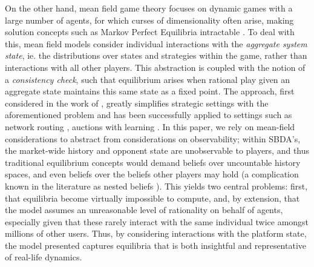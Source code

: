 On the other hand, mean field game theory focuses on dynamic games with a large number of agents, for which curses of dimensionality often arise, making solution concepts such as Markov Perfect Equilibria intractable \citep{maskin2001markov}.
To deal with this, mean field models consider individual interactions with the \textit{aggregate system state}, ie. the distributions over states and strategies within the game, rather than interactions with all other players.
This abstraction is coupled with the notion of a \textit{consistency check}, such that equilibrium arises when rational play given an aggregate state maintains this same state as a fixed point. 
The approach, first considered in the work of \cite{jovanovic1988anonymous}, greatly simplifies strategic settings with the aforementioned problem and has been successfully applied to settings such as network routing \citep{calderone2017markov}, auctions with learning \citep{iyer2014mean}.
In this paper, we rely on mean-field considerations to abstract from considerations on observability; within SBDA's, the market-wide history and opponent state are unobservable to players, and thus traditional equilibrium concepts would demand beliefs over uncountable history spaces, and even beliefs over the beliefs other players may hold (a complication known in the literature as nested beliefs \citep{brandenburger1993hierarchies}).
This yields two central problems: first, that equilibria become virtually impossible to compute, and, by extension, that the model assumes an unreasonable level of rationality on behalf of agents, especially given that these rarely interact with the same individual twice amongst millions of other users.
Thus, by considering interactions with the platform state, the model presented captures equilibria that is both insightful and representative of real-life dynamics.


